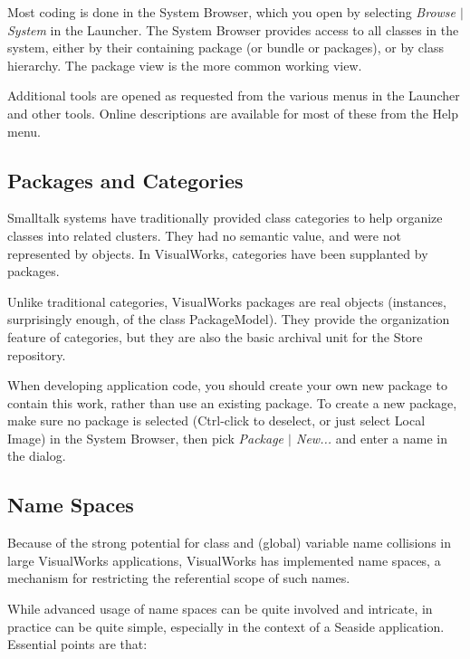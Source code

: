 \documentclass[a4paper,10pt,twoside]{book}
\begin{document}
Most coding is done in the System Browser, which you open by selecting \textit{Browse $|$ System} in the Launcher. The System Browser provides access to all classes in the system, either by their containing package (or bundle or packages), or by class hierarchy. The package view is the more common working view.

Additional tools are opened as requested from the various menus in the Launcher and other tools. Online descriptions are available for most of these from the Help menu.

\subsection{Packages and Categories}
\label{book:gettingstarted:cincomsmalltalk:developing:packages}

Smalltalk systems have traditionally provided class categories to help organize classes into related clusters. They had no semantic value, and were not represented by objects. In VisualWorks, categories have been supplanted by packages.

Unlike traditional categories, VisualWorks packages are real objects (instances, surprisingly enough, of the class PackageModel). They provide the organization feature of categories, but they are also the basic archival unit for the Store repository.

When developing application code, you should create your own new package to contain this work, rather than use an existing package. To create a new package, make sure no package is selected (Ctrl-click to deselect, or just select Local Image) in the System Browser, then pick \textit{Package $|$ New...} and enter a name in the dialog.

\subsection{Name Spaces}
\label{book:gettingstarted:cincomsmalltalk:developing:namespaces}

Because of the strong potential for class and (global) variable name collisions in large VisualWorks applications, VisualWorks has implemented name spaces, a mechanism for restricting the referential scope of such names.

While advanced usage of name spaces can be quite involved and intricate, in practice can be quite simple, especially in the context of a Seaside application. Essential points are that:
\end{document}
